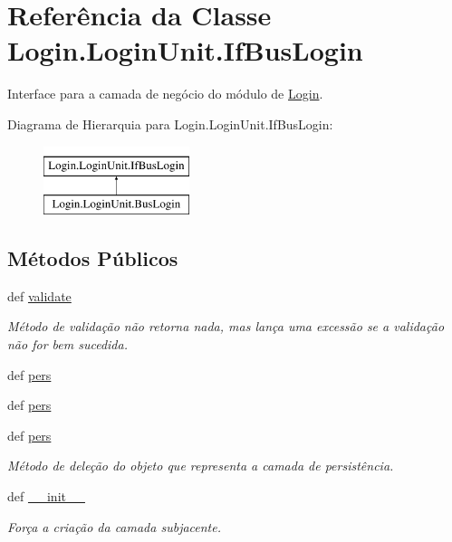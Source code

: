 \hypertarget{classLogin_1_1LoginUnit_1_1IfBusLogin}{\section{Referência da Classe Login.\-Login\-Unit.\-If\-Bus\-Login}
\label{dc/dd6/classLogin_1_1LoginUnit_1_1IfBusLogin}
}


Interface para a camada de negócio do módulo de \hyperlink{namespaceLogin}{Login}.  


Diagrama de Hierarquia para Login.\-Login\-Unit.\-If\-Bus\-Login\-:\begin{figure}[H]
\begin{center}
\leavevmode
\includegraphics[height=2.000000cm]{dc/dd6/classLogin_1_1LoginUnit_1_1IfBusLogin}
\end{center}
\end{figure}
\subsection*{Métodos Públicos}
\begin{DoxyCompactItemize}
\item 
def \hyperlink{classLogin_1_1LoginUnit_1_1IfBusLogin_a55078e3d16b3e0557b557aed92fd7c36}{validate}
\begin{DoxyCompactList}\small\item\em Método de validação não retorna nada, mas lança uma excessão se a validação não for bem sucedida. \end{DoxyCompactList}\item 
def \hyperlink{classLogin_1_1LoginUnit_1_1IfBusLogin_a807b0a5d5bdae58087feb9d810a6538d}{pers}
\item 
def \hyperlink{classLogin_1_1LoginUnit_1_1IfBusLogin_a807b0a5d5bdae58087feb9d810a6538d}{pers}
\item 
def \hyperlink{classLogin_1_1LoginUnit_1_1IfBusLogin_a807b0a5d5bdae58087feb9d810a6538d}{pers}
\begin{DoxyCompactList}\small\item\em Método de deleção do objeto que representa a camada de persistência. \end{DoxyCompactList}\item 
def \hyperlink{classLogin_1_1LoginUnit_1_1IfBusLogin_a974c8e8520b02844836d9c7a8e06379b}{\-\_\-\-\_\-init\-\_\-\-\_\-}
\begin{DoxyCompactList}\small\item\em Força a criação da camada subjacente. \end{DoxyCompactList}\end{DoxyCompactItemize}
